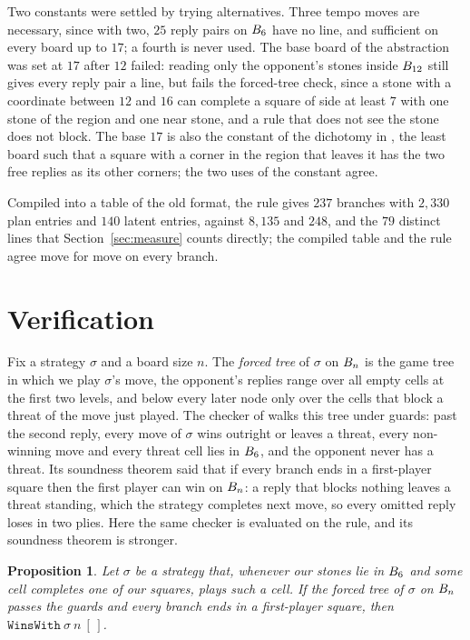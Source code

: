 \documentclass[11pt]{amsart}
\newtheorem{proposition}[theorem]{Proposition}
\theoremstyle{definition}
\theoremstyle{remark}
\begin{document}
Two constants were settled by trying alternatives. Three tempo moves
are necessary, since with two, $25$ reply pairs on $B_6$ have no
line, and sufficient on every board up to $17$; a fourth is never
used. The base board of the abstraction was set at $17$ after $12$
failed: reading only the opponent's stones inside $B_{12}$ still
gives every reply pair a line, but fails the forced-tree check, since
a stone with a coordinate between $12$ and $16$ can complete a square
of side at least $7$ with one stone of the region and one near stone,
and a rule that does not see the stone does not block. The base $17$
is also the constant of the dichotomy in \cite{reid-threshold}, the
least board such that a square with a corner in the region that
leaves it has the two free replies as its other corners; the two uses
of the constant agree.

Compiled into a table of the old format, the rule gives $237$
branches with $2{,}330$ plan entries and $140$ latent entries, against
$8{,}135$ and $248$, and the $79$ distinct lines that
Section~\ref{sec:measure} counts directly; the compiled table and the
rule agree move for move on every branch.

\section{Verification}\label{sec:verify}

Fix a strategy $\sigma$ and a board size $n$. The \emph{forced tree}
of $\sigma$ on $B_n$ is the game tree in which we play $\sigma$'s
move, the opponent's replies range over all empty cells at the first
two levels, and below every later node only over the cells that block
a threat of the move just played. The checker of \cite{reid-threshold}
walks this tree under guards: past the second reply, every move of
$\sigma$ wins outright or leaves a threat, every non-winning move and
every threat cell lies in $B_6$, and the opponent never has a
threat. Its soundness theorem said that if every branch ends in a
first-player square then the first player can win on $B_n$: a
reply that blocks nothing leaves a threat standing, which the strategy
completes next move, so every omitted reply loses in two plies. Here
the same checker is evaluated on the rule, and its soundness theorem
is stronger.

\begin{proposition}\label{prop:forced}
Let $\sigma$ be a strategy that, whenever our stones lie in $B_6$
and some cell completes one of our squares, plays such a cell. If the
forced tree of $\sigma$ on $B_n$ passes the guards and every
branch ends in a first-player square, then
$\texttt{WinsWith}\ \sigma\ n\ [\,]$.
\end{proposition}
\end{document}
